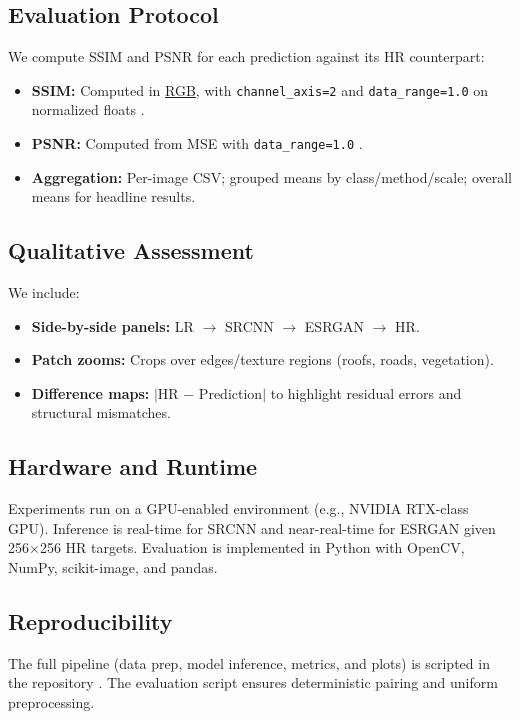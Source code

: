 \documentclass[]{spie}
\begin{document}
\subsection{Evaluation Protocol}
We compute SSIM and PSNR for each prediction against its HR counterpart:
\begin{itemize}
  \item \textbf{SSIM:} Computed in \underline{RGB}, with \texttt{channel\_axis=2} and \texttt{data\_range=1.0} on normalized floats \cite{scikit_image, geeksforgeeks_similarity}.
  \item \textbf{PSNR:} Computed from MSE with \texttt{data\_range=1.0} \cite{scikit_image, geeksforgeeks_psnr}.
    \item \textbf{Aggregation:} Per-image CSV; grouped means by class/method/scale; overall means for headline results.
\end{itemize}

\subsection{Qualitative Assessment}
We include:
\begin{itemize}
    \item \textbf{Side-by-side panels:} LR $\rightarrow$ SRCNN $\rightarrow$ ESRGAN $\rightarrow$ HR.
    \item \textbf{Patch zooms:} Crops over edges/texture regions (roofs, roads, vegetation).
    \item \textbf{Difference maps:} $|$HR $-$ Prediction$|$ to highlight residual errors and structural mismatches.
\end{itemize}

\subsection{Hardware and Runtime}
Experiments run on a GPU-enabled environment (e.g., NVIDIA RTX-class GPU). Inference is real-time for SRCNN and near-real-time for ESRGAN given 256$\times$256 HR targets. Evaluation is implemented in Python with OpenCV, NumPy, scikit-image, and pandas.

\subsection{Reproducibility}
The full pipeline (data prep, model inference, metrics, and plots) is scripted in the repository \cite{github_repo}. The evaluation script ensures deterministic pairing and uniform preprocessing.
\end{document}
